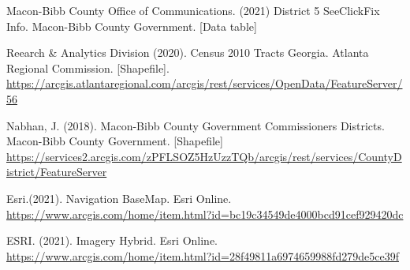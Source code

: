 \documentclass[
]{article}
\begin{document}
Macon-Bibb County Office of Communications. (2021) District 5
SeeClickFix Info. Macon-Bibb County Government. {[}Data table{]}

Reearch \& Analytics Division (2020). Census 2010 Tracts Georgia.
Atlanta Regional Commission. {[}Shapefile{]}.
\url{https://arcgis.atlantaregional.com/arcgis/rest/services/OpenData/FeatureServer/56}

Nabhan, J. (2018). Macon-Bibb County Government Commissioners Districts.
Macon-Bibb County Government. {[}Shapefile{]}
\url{https://services2.arcgis.com/zPFLSOZ5HzUzzTQb/arcgis/rest/services/CountyDistrict/FeatureServer}

Esri.(2021). Navigation BaseMap. Esri Online.
\url{https://www.arcgis.com/home/item.html?id=bc19c34549de4000bcd91cef929420dc}

ESRI. (2021). Imagery Hybrid. Esri Online.
\url{https://www.arcgis.com/home/item.html?id=28f49811a6974659988fd279de5ce39f}
\end{document}
